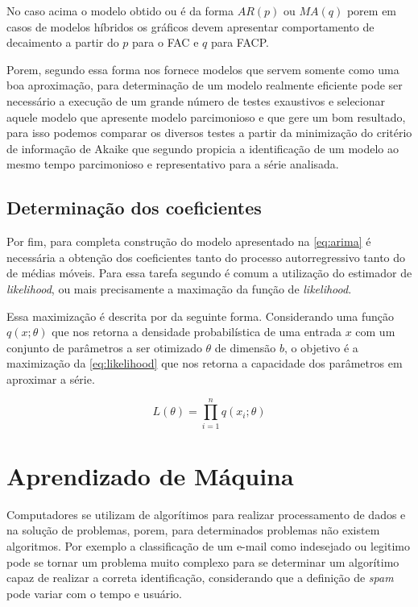 \documentclass[
    12pt,
    oneside,
    a4paper,
    english,
    brazil
]{abntex2}
\begin{document}
No caso acima o  modelo obtido ou é da forma $AR(p)$ ou  $MA(q)$ porem em casos
de modelos híbridos os gráficos  devem apresentar comportamento de decaimento a
partir do $p$ para o FAC e $q$ para FACP\@.

Porem, segundo   essa  forma nos  fornece modelos  que servem
somente  como uma  boa aproximação,  para determinação  de um  modelo realmente
eficiente  pode  ser necessário  a  execução  de  um  grande número  de  testes
exaustivos e selecionar  aquele modelo que apresente modelo  parcimonioso e que
gere  um  bom resultado,  para  isso  podemos  comparar  os diversos  testes  a
partir  da  minimização  do  critério  de  informação  de  Akaike  que  segundo
  propicia  a identificação  de  um  modelo ao  mesmo  tempo
parcimonioso e representativo para a série analisada.

\subsection{Determinação dos coeficientes}

Por fim, para completa construção do modelo apresentado na \autoref{eq:arima} é
necessária  a  obtenção  dos  coeficientes tanto  do  processo  autorregressivo
tanto  do de  médias móveis.  Para essa  tarefa segundo  é
comum a utilização do estimador de \textit{likelihood}, ou mais precisamente a
maximação da função de \textit{likelihood}.

Essa  maximização   é  descrita   por     da  seguinte
forma.  Considerando  uma função  $q(x;\theta)$  que  nos retorna  a  densidade
probabilística de uma entrada $x$ com um conjunto de parâmetros a ser otimizado
$\theta$ de dimensão $b$, o objetivo é a maximização da \autoref{eq:likelihood}
que nos retorna a capacidade dos parâmetros em aproximar a série.

\begin{equation}\label{eq:likelihood}
    L(\theta) = \prod_{i=1}^{n}{q(x_i;\theta)}
\end{equation}

\section{Aprendizado de Máquina}

Computadores se utilizam de algorítimos  para realizar processamento de dados e
na  solução  de  problemas,  porem, para  determinados  problemas  não  existem
algoritmos.  Por  exemplo a  classificação  de  um  e-mail como  indesejado  ou
legitimo  pode se  tornar  um problema  muito complexo  para  se determinar  um
algorítimo  capaz  de realizar  a  correta  identificação, considerando  que  a
definição de \textit{spam} pode variar com o tempo e usuário.
\end{document}
